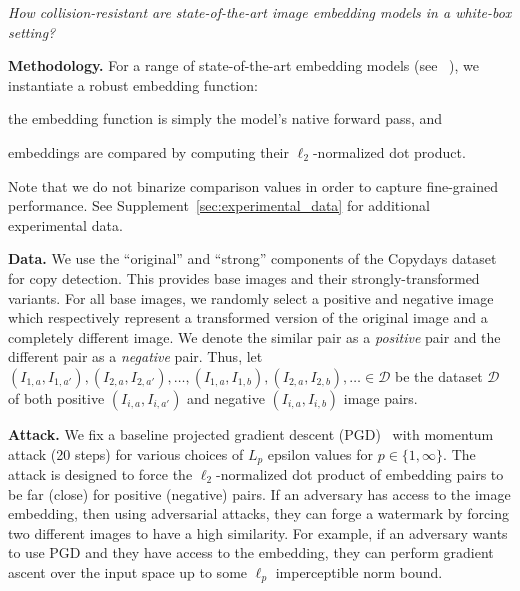 \documentclass[12pt]{article}
\begin{document}
\begin{center}
    \textit{How collision-resistant are state-of-the-art image embedding models in a white-box setting?}
\end{center}

\textbf{Methodology.}
For a range of state-of-the-art embedding models (see ~), we instantiate a robust embedding function:
\begin{enumerate*}[label=(\alph*)]
    \item the embedding function is simply the model's native forward pass, and
    \item embeddings are compared by computing their $\ell_2$-normalized dot product.
\end{enumerate*}
Note that we do not binarize comparison values in order to capture fine-grained performance.
See Supplement~\ref{sec:experimental_data} for additional experimental data.

\textbf{Data.} We use the ``original'' and ``strong'' components of the Copydays dataset~\citep{douze2009evaluation} for copy detection.
This provides base images and their strongly-transformed variants.
For all base images, we randomly select a positive and negative image which respectively represent a transformed version of the original image and a completely different image.
We denote the similar pair as a \textit{positive} pair and the different pair as a \textit{negative} pair.
Thus, let $(I_{1,a}, I_{1,a'}), (I_{2,a}, I_{2,a'}), \ldots, (I_{1,a}, I_{1,b}), (I_{2,a}, I_{2,b}), \ldots \in \mathcal{D}$ be the dataset $\mathcal{D}$ of both positive $(I_{i, a}, I_{i, a'})$ and negative $(I_{i, a}, I_{i, b})$ image pairs.

\textbf{Attack.} We fix a baseline projected gradient descent (PGD)~\citep{madry2018towards} with momentum attack (20 steps) for various choices of $L_p$ epsilon values for $p \in \{1, \infty\}$. 
The attack is designed to force the $\ell_2$-normalized dot product of embedding pairs to be far (close) for positive (negative) pairs.
If an adversary has access to the image embedding, then using adversarial attacks, they can forge a watermark by forcing two different images to have a high similarity.
For example, if an adversary wants to use PGD and they have access to the embedding, they can perform gradient ascent over the input space up to some $\ell_p$ imperceptible norm bound.
\end{document}
